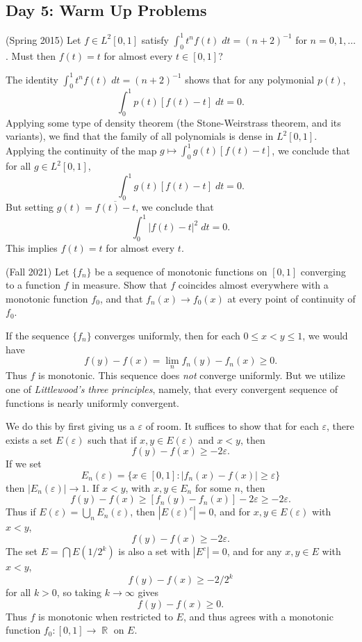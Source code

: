 \documentclass[answers]{exam}
\DeclareMathOperator{\RR}{\mathbb{R}}
\theoremstyle{problemstyle}
\newcommand{\1}[1]{\textbf{1}_{\left[#1\right]}} %
\begin{document}
\begin{questions}
\newpage
\section*{Day 5: Warm Up Problems}

\question (Spring 2015) Let $f \in L^2[0,1]$ satisfy $\int_0^1 t^n f(t)\; dt = (n+2)^{-1}$ for $n = 0, 1,\dots$. Must then $f(t) = t$ for almost every $t \in [0,1]$?
\begin{solution}
    The identity $\int_0^1 t^n f(t)\; dt = (n+2)^{-1}$ shows that for any polymonial $p(t)$,
    \[ \int_0^1 p(t) [f(t) - t]\; dt = 0. \]
    Applying some type of density theorem (the Stone-Weirstrass theorem, and its variants), we find that the family of all polynomials is dense in $L^2[0,1]$. Applying the continuity of the map $g \mapsto \int_0^1 g(t) [f(t) - t]$, we conclude that for all $g \in L^2[0,1]$,
    \[ \int_0^1 g(t) [f(t) - t]\; dt = 0. \]
    But setting $g(t) = \overline{f(t) - t}$, we conclude that
    \[ \int_0^1 |f(t) - t|^2\; dt = 0. \]
    This implies $f(t) = t$ for almost every $t$.
\end{solution}

\question (Fall 2021) Let $\{ f_n \}$ be a sequence of monotonic functions on $[0,1]$ converging to a function $f$ in measure. Show that $f$ coincides almost everywhere with a monotonic function $f_0$, and that $f_n(x) \to f_0(x)$ at every point of continuity of $f_0$.
\begin{solution}
	If the sequence $\{ f_n \}$ converges uniformly, then for each $0 \leq x < y \leq 1$, we would have
	\[ f(y) - f(x) = \lim_n f_n(y) - f_n(x) \geq 0. \]
	Thus $f$ is monotonic. This sequence does \emph{not} converge uniformly. But we utilize one of \emph{Littlewood's three principles}, namely, that every convergent sequence of functions is nearly uniformly convergent.

	We do this by first giving us a $\varepsilon$ of room. It suffices to show that for each $\varepsilon$, there exists a set $E(\varepsilon)$ such that if $x,y \in E(\varepsilon)$ and $x < y$, then
	\[ f(y) - f(x) \geq - 2 \varepsilon. \]
	If we set
	\[ E_n(\varepsilon) = \{ x \in [0,1] : |f_n(x) - f(x)| \geq \varepsilon \} \]
	then $|E_n(\varepsilon)| \to 1$. If $x < y$, with $x,y \in E_n$ for some $n$, then
	\[ f(y) - f(x) \geq [f_n(y) - f_n(x)] - 2 \varepsilon \geq -2\varepsilon. \]
	Thus if $E(\varepsilon) = \bigcup_n E_n(\varepsilon)$, then $|E(\varepsilon)^c| = 0$, and for $x,y \in E(\varepsilon)$ with $x < y$,
	\[ f(y) - f(x) \geq - 2 \varepsilon. \]
	The set $E = \bigcap E(1/2^k)$ is also a set with $|E^c| = 0$, and for any $x,y \in E$ with $x < y$,
	\[ f(y) - f(x) \geq - 2 / 2^k \]
	for all $k > 0$, so taking $k \to \infty$ gives
	\[ f(y) - f(x) \geq 0. \]
	Thus $f$ is monotonic when restricted to $E$, and thus agrees with a monotonic function $f_0: [0,1] \to \RR$ on $E$.


\end{solution}
\end{questions}
\end{document}
